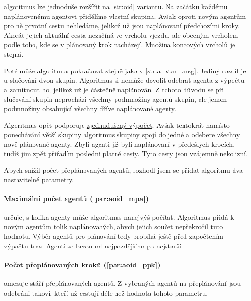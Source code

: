  algoritmus lze jednoduše rozšířit na \ref{str:oid} variantu.
Na začátku každému naplánovanému agentovi přidělíme vlastní skupinu.
Avšak oproti novým agentům pro ně prvotní cestu nehledáme, jelikož už jsou naplánovaní předchozími kroky.
Akorát jejich aktuální cesta nezačíná ve vrcholu vjezdu,
ale obecným vrcholem podle toho, kde se v plánovaný krok nacházejí.
Množina koncových vrcholů je stejná.

Poté může algoritmus pokračovat stejně jako v \ref{str:a_star_arsg}.
Jediný rozdíl je u slučování dvou skupin.
Algoritmus si nemůže dovolit odebrat agenta z výpočtu a zamítnout ho, jelikož už je částečně naplánován.
Z tohoto důvodu se při slučování skupin neprochází všechny podmnožiny agentů skupin,
ale jenom podmnožiny obsahující všechny dříve naplánované agenty.

Algoritmus opět podporuje \hyperref[par:arsg_zvp]{zjednudušený výpočet}.
Avšak tentokrát namísto ponechávání větší skupiny
algoritmus skupiny spojí do jedné a odebere všechny nově plánované agenty.
Zbylí agenti již byli naplánovaní v předešlých krocích, tudíž jim zpět přiřadím poslední platné cesty.
Tyto cesty jsou vzájemně nekolizní.

Abych snížil počet přeplánovaných agentů, rozhodl jsem se přidat algoritmu dva nastavitelné parametry.

\paragraph{Maximální počet agentů (\ref{par:aoid_mpa})} určuje, s kolika agenty může algoritmus nanejvýš počítat.
Algoritmus přidá k novým agentům tolik naplánovaných, abych jejich součet nepřekročil tuto hodnotu.
Výběr agentů pro plánování tedy probíhá ještě před započtením výpočtu tras.
Agenti se berou od nejpozdějšího po nejstarší.

\paragraph{Počet přeplánovaných kroků (\ref{par:aoid_ppk})} omezuje stáří přeplánovaných agentů.
Z vybraných agentů na přeplánování jsou odebráni takoví, kteří už cestují déle než hodnota tohoto parametru.
